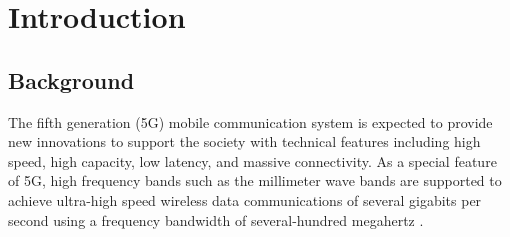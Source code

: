 \documentclass[a4paper,12pt]{report}
\begin{document}
\pagestyle{empty}

\begin{center}
  \end{center}
  
  
  \newpage

\renewcommand{\thepage}{\roman{page}}
\cleardoublepage
\pagestyle{fancy}
\lhead{\rightmark}
\tableofcontents
\listoffigures
\listoftables

\cleardoublepage

\chapter{Introduction}

\setcounter{page}{1}
\renewcommand{\thepage}{\arabic{page}}

\section{Background}

The fifth generation (5G) mobile communication system
is expected to provide new innovations to support the society
with technical features including high speed, high
capacity, low latency, and massive connectivity.
As a special
feature of 5G, high frequency bands such as the millimeter
wave bands are supported to achieve ultra-high speed
wireless data communications of several gigabits per second
using a frequency bandwidth of
several-hundred megahertz \cite{docomo_6G_white_paper}.
\end{document}
